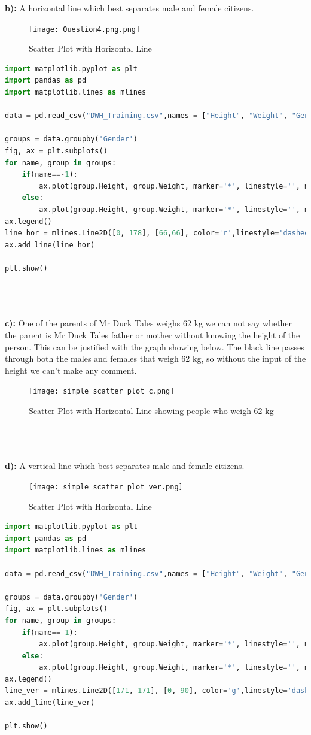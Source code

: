 \documentclass{article}
\begin{document}
\textbf{b):} A horizontal line which best separates male and female citizens.
\begin{figure}[H]
\centering
    \texttt{[image: Question4.png.png]}
\caption{Scatter Plot with Horizontal Line}
\label{fig:scatter_plot2}
\end{figure}
\begin{lstlisting}[language=Python]
import matplotlib.pyplot as plt
import pandas as pd
import matplotlib.lines as mlines

data = pd.read_csv("DWH_Training.csv",names = ["Height", "Weight", "Gender"])

groups = data.groupby('Gender')
fig, ax = plt.subplots()
for name, group in groups:
    if(name==-1):
        ax.plot(group.Height, group.Weight, marker='*', linestyle='', ms=12, label='Female')
    else:
        ax.plot(group.Height, group.Weight, marker='*', linestyle='', ms=12, label='Male')
ax.legend()
line_hor = mlines.Line2D([0, 178], [66,66], color='r',linestyle='dashed')
ax.add_line(line_hor)

plt.show()
\end{lstlisting}
\\~\\
\\
\textbf{c):} One of the parents of Mr Duck Tales weighs 62 kg we can not say whether the parent is Mr Duck Tales father or mother without knowing the height of the person. This can be justified with the graph showing below. The black line passes through both the males and females that weigh 62 kg, so without the input of the height we can't make any comment.
\begin{figure}[H]
\centering
    \texttt{[image: simple\_scatter\_plot\_c.png]}
\caption{Scatter Plot with Horizontal Line showing people who weigh 62 kg}
\label{fig:scatter_plot3}
\end{figure}
\\~\\
\\
\textbf{d):} A vertical line which best separates male and female citizens.
\begin{figure}[H]
\centering
    \texttt{[image: simple\_scatter\_plot\_ver.png]}
\caption{Scatter Plot with Horizontal Line}
\label{fig:scatter_plot4}
\end{figure}
\begin{lstlisting}[language=Python]
import matplotlib.pyplot as plt
import pandas as pd
import matplotlib.lines as mlines

data = pd.read_csv("DWH_Training.csv",names = ["Height", "Weight", "Gender"])

groups = data.groupby('Gender')
fig, ax = plt.subplots()
for name, group in groups:
    if(name==-1):
        ax.plot(group.Height, group.Weight, marker='*', linestyle='', ms=12, label='Female')
    else:
        ax.plot(group.Height, group.Weight, marker='*', linestyle='', ms=12, label='Male')
ax.legend()
line_ver = mlines.Line2D([171, 171], [0, 90], color='g',linestyle='dashed')
ax.add_line(line_ver)

plt.show()
\end{lstlisting}
\end{document}
